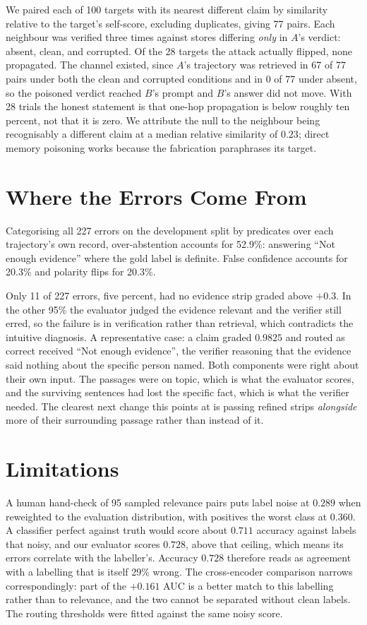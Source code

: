 \documentclass[journal]{IEEEtran}
\begin{document}
We paired each of 100 targets with its nearest different claim by similarity
relative to the target's self-score, excluding duplicates, giving 77 pairs. Each
neighbour was verified three times against stores differing \emph{only} in $A$'s
verdict: absent, clean, and corrupted. Of the 28 targets the attack actually
flipped, none propagated. The channel existed, since $A$'s trajectory was
retrieved in 67 of 77 pairs under both the clean and corrupted conditions and in
0 of 77 under absent, so the poisoned verdict reached $B$'s prompt and $B$'s
answer did not move. With 28 trials the honest statement is that one-hop
propagation is below roughly ten percent, not that it is zero. We attribute the
null to the neighbour being recognisably a different claim at a median relative
similarity of $0.23$; direct memory poisoning works because the fabrication
paraphrases its target.

\section{Where the Errors Come From}
\label{sec:failures}
Categorising all 227 errors on the development split by predicates over each
trajectory's own record, over-abstention accounts for 52.9\%: answering ``Not
enough evidence'' where the gold label is definite. False confidence accounts for
20.3\% and polarity flips for 20.3\%.

Only 11 of 227 errors, five percent, had no evidence strip graded above $+0.3$.
In the other 95\% the evaluator judged the evidence relevant and the verifier
still erred, so the failure is in verification rather than retrieval, which
contradicts the intuitive diagnosis. A representative case: a claim graded
$0.9825$ and routed as correct received ``Not enough evidence'', the verifier
reasoning that the evidence said nothing about the specific person named. Both
components were right about their own input. The passages were on topic, which is
what the evaluator scores, and the surviving sentences had lost the specific
fact, which is what the verifier needed. The clearest next change this points at
is passing refined strips \emph{alongside} more of their surrounding passage
rather than instead of it.

\section{Limitations}
\label{sec:limitations}
A human hand-check of 95 sampled relevance pairs puts label noise at $0.289$
when reweighted to the evaluation distribution, with positives the worst class at
$0.360$. A classifier perfect against truth would score about $0.711$ accuracy
against labels that noisy, and our evaluator scores $0.728$, above that ceiling,
which means its errors correlate with the labeller's. Accuracy $0.728$ therefore
reads as agreement with a labelling that is itself 29\% wrong. The cross-encoder
comparison narrows correspondingly: part of the $+0.161$ AUC is a better match to
this labelling rather than to relevance, and the two cannot be separated without
clean labels. The routing thresholds were fitted against the same noisy score.
\end{document}
